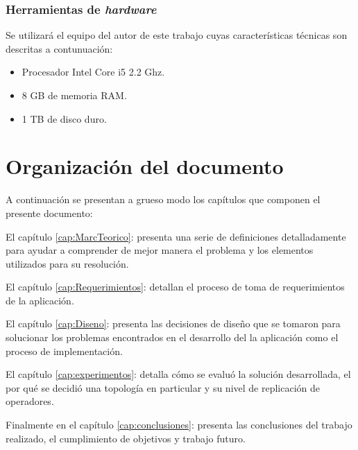\subsubsection{Herramientas de \textit{hardware}}
\label{subsubsec:HerrHardw}

Se utilizará el equipo del autor de este trabajo cuyas características técnicas son descritas a contunuación:
\begin{itemize}
\item Procesador Intel Core i5 2.2 Ghz.
\item 8 GB de memoria RAM.
\item 1 TB de disco duro.
\end{itemize}

\section{Organización del documento}
\label{intro:organizacion}

A continuación se presentan a grueso modo los capítulos que componen el presente documento:

El capítulo \ref{cap:MarcTeorico}:  presenta una serie de definiciones detalladamente para ayudar a comprender de mejor manera el problema y los elementos utilizados para su resolución.

El capítulo \ref{cap:Requerimientos}:  detallan el proceso de toma de requerimientos de la aplicación.

El capítulo \ref{cap:Diseno}:  presenta las decisiones de diseño que se tomaron para solucionar los problemas encontrados en el desarrollo del la aplicación como el proceso de implementación.

El capítulo \ref{cap:experimentos}:  detalla cómo se evaluó la solución desarrollada, el por qué se decidió una topología en particular y su nivel de replicación de operadores.

Finalmente en el capítulo \ref{cap:conclusiones}:  presenta las conclusiones del trabajo realizado, el cumplimiento de objetivos y trabajo futuro.